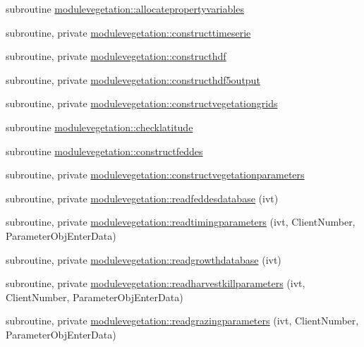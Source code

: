 \begin{DoxyCompactItemize}
\item 
subroutine \mbox{\hyperlink{namespacemodulevegetation_a510aa5d26336e50f405ca27491ba7996}{modulevegetation\+::allocatepropertyvariables}}
\item 
subroutine, private \mbox{\hyperlink{namespacemodulevegetation_ada5193380c49212dfdc1293861c924a0}{modulevegetation\+::constructtimeserie}}
\item 
subroutine, private \mbox{\hyperlink{namespacemodulevegetation_a12974a55f8580bce1b17db7e139d7955}{modulevegetation\+::constructhdf}}
\item 
subroutine, private \mbox{\hyperlink{namespacemodulevegetation_a687f37b7582103fd8a3308f5602b635f}{modulevegetation\+::constructhdf5output}}
\item 
subroutine, private \mbox{\hyperlink{namespacemodulevegetation_a244fa0ac53269288775789c370d4ef6e}{modulevegetation\+::constructvegetationgrids}}
\item 
subroutine \mbox{\hyperlink{namespacemodulevegetation_a8c93a8f99238f47c92bfed9cc9ddedb8}{modulevegetation\+::checklatitude}}
\item 
subroutine \mbox{\hyperlink{namespacemodulevegetation_a74fe469b99fa1d5d3f2ef2182dd59c7b}{modulevegetation\+::constructfeddes}}
\item 
subroutine, private \mbox{\hyperlink{namespacemodulevegetation_a11da2d592ded0bd3811f9e90de324046}{modulevegetation\+::constructvegetationparameters}}
\item 
subroutine, private \mbox{\hyperlink{namespacemodulevegetation_a561695c331526aacf6d2359ccf064e5b}{modulevegetation\+::readfeddesdatabase}} (ivt)
\item 
subroutine, private \mbox{\hyperlink{namespacemodulevegetation_a9b539132b7ee0190f99651024f4550ee}{modulevegetation\+::readtimingparameters}} (ivt, Client\+Number, Parameter\+Obj\+Enter\+Data)
\item 
subroutine, private \mbox{\hyperlink{namespacemodulevegetation_a0354ed5206e5b8c4f1269740f6b6506d}{modulevegetation\+::readgrowthdatabase}} (ivt)
\item 
subroutine, private \mbox{\hyperlink{namespacemodulevegetation_aec7d28b5d51b61d5ccc514ba6a645846}{modulevegetation\+::readharvestkillparameters}} (ivt, Client\+Number, Parameter\+Obj\+Enter\+Data)
\item 
subroutine, private \mbox{\hyperlink{namespacemodulevegetation_ac0d2b1971374eb7a2ded39cf56b0bd04}{modulevegetation\+::readgrazingparameters}} (ivt, Client\+Number, Parameter\+Obj\+Enter\+Data)
\item 

\end{DoxyCompactItemize}
